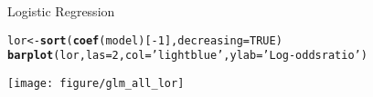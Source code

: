 \documentclass{beamer}
\makeatletter
\newcommand{\hlnum}[1]{\textcolor[rgb]{0.686,0.059,0.569}{#1}}%
\newcommand{\hlstr}[1]{\textcolor[rgb]{0.192,0.494,0.8}{#1}}%
\newcommand{\hlopt}[1]{\textcolor[rgb]{0,0,0}{#1}}%
\newcommand{\hlstd}[1]{\textcolor[rgb]{0.345,0.345,0.345}{#1}}%
\newcommand{\hlkwb}[1]{\textcolor[rgb]{0.69,0.353,0.396}{#1}}%
\newcommand{\hlkwc}[1]{\textcolor[rgb]{0.333,0.667,0.333}{#1}}%
\newcommand{\hlkwd}[1]{\textcolor[rgb]{0.737,0.353,0.396}{\textbf{#1}}}%
\newenvironment{kframe}{%
 \def\at@end@of@kframe{}%
 \ifinner\ifhmode%
  \def\at@end@of@kframe{\end{minipage}}%
  \begin{minipage}{\columnwidth}%
 \fi\fi%
 \def\FrameCommand##1{\hskip\@totalleftmargin \hskip-\fboxsep
 \colorbox{shadecolor}{##1}\hskip-\fboxsep
     \hskip-\linewidth \hskip-\@totalleftmargin \hskip\columnwidth}%
 \MakeFramed {\advance\hsize-\width
   \@totalleftmargin\z@ \linewidth\hsize
   \@setminipage}}%
 {\par\unskip\endMakeFramed%
 \at@end@of@kframe}
\newenvironment{knitrout}{}{} %
\makeatother
\begin{document}
\begin{frame}[fragile]{Logistic Regression}
\begin{knitrout}\tiny
{}\color{fgcolor}\begin{kframe}
\begin{alltt}
\hlstd{lor} \hlkwb{<-} \hlkwd{sort}\hlstd{(}\hlkwd{coef}\hlstd{(model)[}\hlopt{-}\hlnum{1}\hlstd{],} \hlkwc{decreasing}\hlstd{=}\hlnum{TRUE}\hlstd{)}
\hlkwd{barplot}\hlstd{(lor,} \hlkwc{las}\hlstd{=}\hlnum{2}\hlstd{,} \hlkwc{col}\hlstd{=}\hlstr{'lightblue'}\hlstd{,} \hlkwc{ylab}\hlstd{=}\hlstr{'Log-odds ratio'}\hlstd{)}
\end{alltt}
\end{kframe}

{\centering \texttt{[image: figure/glm\_all\_lor]} 

}



\end{knitrout}
\end{frame}
\end{document}
